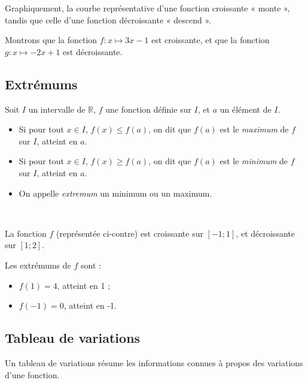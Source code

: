 \begin{remarque}
  Graphiquement, la courbe représentative d'une fonction croissante
  « monte », tandis que celle d'une fonction décroissante « descend ».
\end{remarque}

\begin{exemple}
  Montrons que la fonction $f:x\mapsto 3x-1$ est croissante, et que la fonction
  $g:x\mapsto -2x+1$ est décroissante.
\end{exemple}

\subsection{Extrémums}

\begin{definition}
  Soit $I$ un intervalle de $\mathbb R$, $f$ une fonction définie sur $I$, et
  $a$ un élément de $I$.
  \begin{itemize}
    \item Si pour tout $x\in I$, $f(x)\leq f(a)$, on dit que $f(a)$ est le
      \emph{maximum} de $f$ sur $I$, atteint en $a$.
    \item Si pour tout $x\in I$, $f(x)\geq f(a)$, on dit que $f(a)$ est le
      \emph{minimum} de $f$ sur $I$, atteint en $a$.
    \item On appelle \emph{extremum} un minimum ou un maximum.
  \end{itemize}
\end{definition}

\begin{exemple}~
  \begin{multicols}{2}

    La fonction $f$ (représentée ci-contre) est croissante sur $[-1;1]$, et décroissante sur $[1;2]$.

    Les extrémums de $f$ sont :
    \begin{itemize}
      \item $f(1)=4$, atteint en 1 ;
      \item $f(-1)=0$, atteint en -1.
    \end{itemize}

  \end{multicols}
\end{exemple}

\subsection{Tableau de variations}

\begin{definition}
  Un tableau de variations résume les informations connues à propos des variations d'une fonction.
\end{definition}

